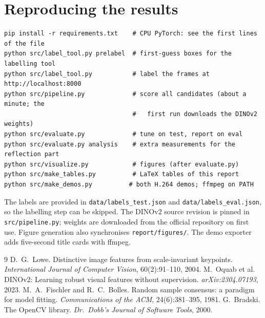 \documentclass[11pt,a4paper]{article}
\begin{document}
\section{Reproducing the results}
\begin{verbatim}
pip install -r requirements.txt    # CPU PyTorch: see the first lines of the file
python src/label_tool.py prelabel  # first-guess boxes for the labelling tool
python src/label_tool.py           # label the frames at http://localhost:8000
python src/pipeline.py             # score all candidates (about a minute; the
                                   #   first run downloads the DINOv2 weights)
python src/evaluate.py             # tune on test, report on eval
python src/evaluate.py analysis    # extra measurements for the reflection part
python src/visualize.py            # figures (after evaluate.py)
python src/make_tables.py          # LaTeX tables of this report
python src/make_demos.py          # both H.264 demos; ffmpeg on PATH
\end{verbatim}
The labels are provided in \texttt{data/labels\_test.json} and \texttt{data/labels\_eval.json}, so the labelling step can be skipped.
The DINOv2 source revision is pinned in \texttt{src/pipeline.py}; weights are downloaded from the official repository on first use. Figure generation also synchronises \texttt{report/figures/}. The demo exporter adds five-second title cards with ffmpeg.

\begin{thebibliography}{9}
 D.\ G.\ Lowe. Distinctive image features from scale-invariant keypoints. \emph{International Journal of Computer Vision}, 60(2):91--110, 2004.
 M.\ Oquab et al. DINOv2: Learning robust visual features without supervision. \emph{arXiv:2304.07193}, 2023.
 M.\ A.\ Fischler and R.\ C.\ Bolles. Random sample consensus: a paradigm for model fitting. \emph{Communications of the ACM}, 24(6):381--395, 1981.
 G.\ Bradski. The OpenCV library. \emph{Dr.\ Dobb's Journal of Software Tools}, 2000.
\end{thebibliography}
\end{document}
